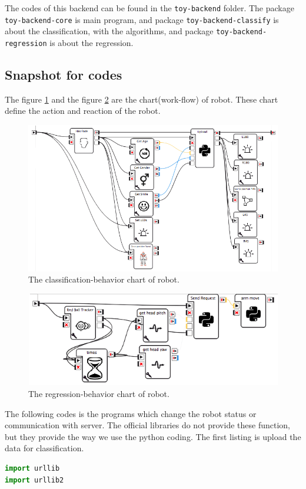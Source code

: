 \documentclass[twoside]{article}
\begin{document}
\begin{appendix}
	The codes of this backend can be found in the \verb|toy-backend| folder.
	The package \verb|toy-backend-core| is main program, and package \verb|toy-backend-classify| is about the classification,
	with the algorithms, and package \verb|toy-backend-regression| is about the regression.
	
	\subsection{Snapshot for codes}
	\label{code:nao:snapshot}
	
	The figure \ref{fig:nao-classify} and the figure \ref{fig:nao-regress} are the chart(work-flow) of robot.
	These chart define the action and reaction of the robot. 
	
	\begin{figure}
		\centering
		\includegraphics[width=0.7\linewidth]{nao-classify}
		\caption{The classification-behavior chart of robot.}
		\label{fig:nao-classify}
	\end{figure}
	\begin{figure}
		\centering
		\includegraphics[width=0.7\linewidth]{nao-regress}
		\caption{The regression-behavior chart of robot.}
		\label{fig:nao-regress}
	\end{figure}
	
	The following codes is the programs which change the robot status or communication with server.
	The official libraries do not provide these function, but they provide the way we use the python  coding.
	The first listing is upload the data for classification.
	\begin{lstlisting}[language=python]
import urllib
import urllib2


\end{lstlisting}
\end{appendix}
\end{document}
